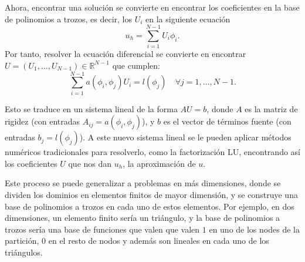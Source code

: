 \documentclass[a4paper,11pt,spanish, twoside, leqno]{tfg-uam}
\theoremstyle{definition}
\begin{document}
Ahora, encontrar una solución se convierte en encontrar los coeficientes en la base de polinomios a trozos, es decir, los $U_i$ en la siguiente ecuación
\begin{equation}
    u_h = \sum_{i=1}^{N-1} U_i\phi_i.
\end{equation}
Por tanto, resolver la ecuación diferencial se convierte en encontrar $U=(U_1,\dots, U_{N-1}) \in \mathbb{R}^{N-1}$ que cumplen:
\begin{equation}
    \sum_{i=1}^{N-1} a\left( \phi_i,\phi_j\right)U_i = l(\phi_j) \quad \forall j = 1,\dots,N-1.
\end{equation}

Esto se traduce en un sistema lineal de la forma $AU = b$, donde $A$ es la matriz de rigidez (con entradas $A_{ij}=a\left( \phi_i,\phi_j\right)$), y $b$ es el vector de términos fuente (con entradas $b_j = l(\phi_j)$). A este nuevo sistema lineal se le pueden aplicar métodos numéricos tradicionales para resolverlo, como la factorización LU, encontrando así los coeficientes $U$ que nos dan $u_h$, la aproximación de $u$.

Este proceso se puede generalizar a problemas en más dimensiones, donde se dividen los dominios en elementos finitos de mayor dimensión, y se construye una base de polinomios a trozos en cada uno de estos elementos. Por ejemplo, en dos dimensiones, un elemento finito sería un triángulo, y la base de polinomios a trozos sería una base de funciones que valen que valen $1$ en uno de los nodes de la partición, $0$ en el resto de nodos y además son lineales en cada uno de los triángulos.
\end{document}
